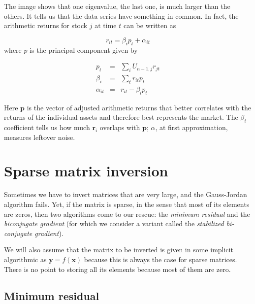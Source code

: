 \documentclass[justified, sixbynine]{tufte-book}
\theoremstyle{plain}%
\newtheorem * {corollary}{Corollary}
\theoremstyle{definition}
\theoremstyle{remark}
\newtheorem * {remark}{Remark}
\newtheorem * {note}{Note}
\begin{document}
\begin{fullwidth}

The image shows that one eigenvalue, the last one, is much larger than the others. It tells us that the data series have something in common. In fact, the arithmetic returns for stock $j$ at time $t$ can be written as

\begin{equation}
r_{it} = \beta_i p_t + \alpha_{it}
\end{equation}
where $p$ is the principal component given by

\begin{eqnarray}
p_t &=& \sum_i U_{n-1, j} r_{jt} \\
\beta_i &=& \sum_t r_{it} p_t \\
\alpha_{it} &=& r_{it} - \beta_i p_t
\end{eqnarray}

Here $\mathbf{p}$ is the vector of adjusted arithmetic returns that better correlates with the returns of the individual assets and therefore best represents the market. The $\beta_i$ coefficient tells us how much $\mathbf{r}_i$ overlaps with $\mathbf{p}$; $\alpha$, at first approximation, measures leftover noise.

\goodbreak\section{Sparse matrix inversion}


Sometimes we have to invert matrices that are very large, and the Gauss-Jordan algorithm fails. Yet, if the matrix is sparse, in the sense that most of its elements are zeros, then two algorithms come to our rescue: the {\it minimum residual} and the {\it biconjugate gradient} (for which we consider a variant called the {\it stabilized bi-conjugate gradient}).

We will also assume that the matrix to be inverted is given in some implicit algorithmic as $\mathbf{y}=f(\mathbf{x})$ because this is always the case for sparse matrices. There is no point to storing all its elements because most of them are zero.


\goodbreak\subsection{Minimum residual}



\end{fullwidth}
\end{document}
